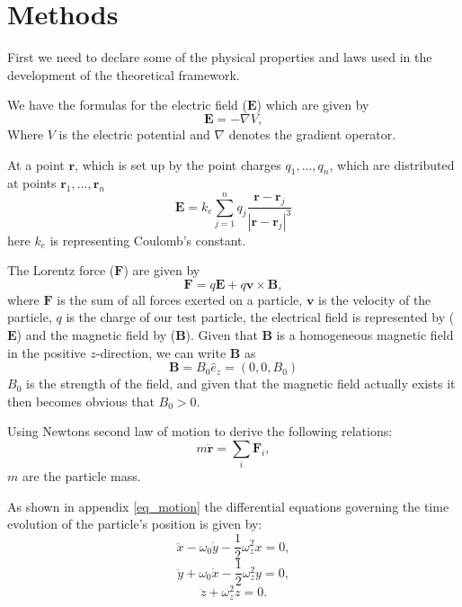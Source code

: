 \documentclass[english,notitlepage,reprint,nofootinbib]{revtex4-1}  %
\begin{document}
	\section{Methods}\label{sec:methods}

	First we need to declare some of the physical properties and laws used in the development of the theoretical framework.

	We have the formulas for the electric field ($\mathbf{E}$) which are given by
	\begin{equation} \label{eq:electric field}
		\mathbf{E} = -\nabla V,
	\end{equation}
	Where $V$ is the electric potential and $\nabla$ denotes the gradient operator.
	
	At a point $\mathbf{r}$, which is set up by the point charges ${q_1, ..., q_n}$, which are distributed at points ${\mathbf{r}_1, ..., \mathbf{r}_n}$
	\begin{equation} \label{eq:electric field2}
		\mathbf{E} = k_e \sum_{j=1}^n q_j \frac{\mathbf{r}-\mathbf{r}_j}{|\mathbf{r}-\mathbf{r}_j|^3}
	\end{equation}
	here $k_e$ is representing Coulomb’s constant.

	The Lorentz force ($\mathbf{F}$) are given by
	\begin{equation} \label{eq:Lorentz force}
		\mathbf{F} = q\mathbf{E} + q\mathbf{v}\times \mathbf{B},
	\end{equation}
	where $\mathbf{F}$ is the sum of all forces exerted on a particle, $\mathbf{v}$ is the velocity of the particle, $q$ is the charge of our test particle, the electrical field is represented by ($\mathbf{E}$) and the magnetic field by ($\mathbf{B}$). Given that $\mathbf{B}$ is a homogeneous magnetic field in the positive $z$-direction, we can write $\mathbf{B}$ as
	\begin{equation} \label{eq:Bfield}
		\mathbf{B} = B_0\hat{e}_z = (0, 0, B_0)
	\end{equation}
	$B_0$ is the strength of the field, and given that the magnetic field actually exists it then becomes obvious that $B_0 > 0$.

	Using Newtons second law of motion to derive the following relations:
	\begin{equation} \label{eq:newtons2}
		m\ddot{\mathbf{r}} = \sum_i \mathbf{F}_i,
	\end{equation}
	$m$ are the particle mass.

	As shown in appendix \ref{eq_motion} the differential equations governing the time evolution of the particle’s position is given by:
	\begin{equation}\label{eq:newtonx}
		\ddot{x} - \omega_0 \dot{y} - \frac{1}{2}\omega_z^2 x = 0, 
	\end{equation}
	\begin{equation} \label{eq:newtony}
		\ddot{y} + \omega_0 \dot{x} - \frac{1}{2}\omega_z^2 y = 0,
	\end{equation}
	\begin{equation} \label{eq:newtonz}
		\ddot{z} + \omega_z^2 z = 0. 
	\end{equation}
\end{document}
